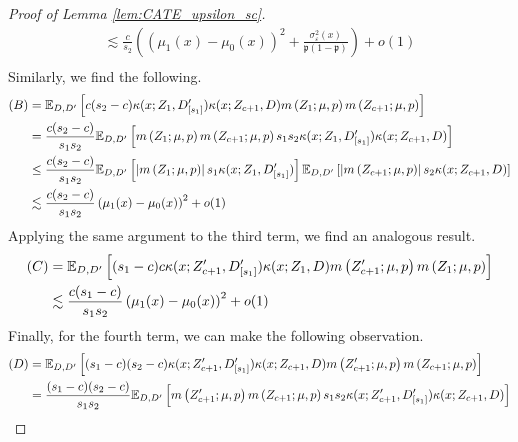 \begin{proof}[Proof of Lemma \ref{lem:CATE_upsilon_sc}]
\begin{equation}
\begin{aligned}
			\lesssim \frac{c}{s_2} \left(\left(\mu_1(x) - \mu_0(x)\right)^2 + \frac{\sigma^2_{\varepsilon}(x)}{\mathfrak{p}(1 - \mathfrak{p})}\right) + o(1)\\
		\end{aligned}
	\end{equation}
	Similarly, we find the following.
	\begin{equation}
		\begin{aligned}
			(B)
			& = \mathbb{E}_{D, D^{\prime}}\left[c (s_2 - c) \kappa(x; Z_{1}, D_{[s_1]}^{\prime})\kappa(x; Z_{c+1}, D) m\left(Z_{1}; \mu, p\right) m\left(Z_{c+1}; \mu, p\right)\right]\\
			& = \frac{c (s_2 - c)}{s_1 s_2} \mathbb{E}_{D, D^{\prime}}\left[m\left(Z_{1}; \mu, p\right) m\left(Z_{c+1}; \mu, p\right) s_1 s_2 \kappa(x; Z_{1}, D_{[s_1]}^{\prime})\kappa(x; Z_{c+1}, D) \right]\\
			& \leq \frac{c (s_2 - c)}{s_1 s_2} \mathbb{E}_{D, D^{\prime}}\left[\left|m\left(Z_{1}; \mu, p\right)\right|  s_1 \kappa(x; Z_{1}, D_{[s_1]}^{\prime})\right]
			\mathbb{E}_{D, D^{\prime}}\left[\left| m\left(Z_{c+1}; \mu, p\right) \right| s_2 \kappa(x; Z_{c+1}, D) \right] \\
			& \lesssim \frac{c (s_2 - c)}{s_1 s_2} \left(\mu_1(x) - \mu_0(x)\right)^2 + o(1)
		\end{aligned}
	\end{equation}
	Applying the same argument to the third term, we find an analogous result.
	\begin{equation}
		\begin{aligned}
			(C)
			& = \mathbb{E}_{D, D^{\prime}}\left[(s_1 - c)c\kappa(x; Z_{c+1}^{\prime}, D_{[s_1]}^{\prime}) \kappa(x; Z_{1}, D) m\left(Z_{c+1}^{\prime}; \mu, p\right) m\left(Z_{1}; \mu, p\right)\right]\\
			& \lesssim  \frac{c (s_1 - c)}{s_1 s_2} \left(\mu_1(x) - \mu_0(x)\right)^2 + o(1)
		\end{aligned}
	\end{equation}
	Finally, for the fourth term, we can make the following observation.
	\begin{equation}
		\begin{aligned}
			(D)
			& = \E_{D, D^{\prime}}\left[(s_1 - c)(s_2 - c)\kappa(x; Z_{c+1}^{\prime}, D_{[s_1]}^{\prime}) \kappa(x; Z_{c+1}, D) m\left(Z_{c+1}^{\prime}; \mu, p\right) m\left(Z_{c+1}; \mu, p\right)\right]\\
			& = \frac{(s_1 - c)(s_2 - c)}{s_1 s_2}\E_{D, D^{\prime}}\left[m\left(Z_{c+1}^{\prime}; \mu, p\right) m\left(Z_{c+1}; \mu, p\right) s_1 s_2 \kappa(x; Z_{c+1}^{\prime}, D_{[s_1]}^{\prime}) \kappa(x; Z_{c+1}, D)\right]\\

\end{aligned}
\end{equation}
\end{proof}
